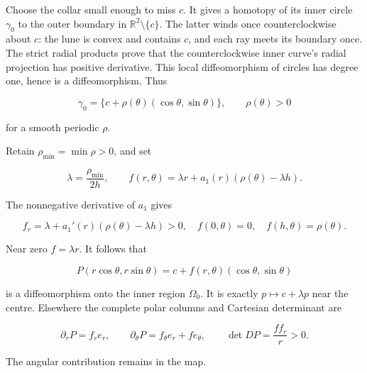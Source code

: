 Choose the collar small enough to miss \(c\). It gives a homotopy of its inner circle \(\gamma_0\) to the outer boundary in \(\mathbb R^2\setminus\{c\}\). The latter winds once counterclockwise about \(c\): the lune is convex and contains \(c\), and each ray meets its boundary once. The strict radial products prove that the counterclockwise inner curve's radial projection has positive derivative. This local diffeomorphism of circles has degree one, hence is a diffeomorphism. Thus

\begin{equation}
\gamma_0=\{c+\rho(\theta)(\cos\theta,\sin\theta)\},
\qquad \rho(\theta)>0
\label{courseIII:whitney-move-with-controlled-support:eq:4.12}
\end{equation}

for a smooth periodic \(\rho\).

Retain \(\rho_{\min}=\min\rho>0\), and set

\begin{equation}
\lambda=\frac{\rho_{\min}}{2h},\qquad
f(r,\theta)=\lambda r+a_1(r)(\rho(\theta)-\lambda h).
\label{courseIII:whitney-move-with-controlled-support:eq:4.13}
\end{equation}

The nonnegative derivative of \(a_1\) gives

\begin{equation}
f_r=\lambda+a_1'(r)(\rho(\theta)-\lambda h)>0,\quad
f(0,\theta)=0,\quad f(h,\theta)=\rho(\theta).
\label{courseIII:whitney-move-with-controlled-support:eq:4.14}
\end{equation}

Near zero \(f=\lambda r\). It follows that

\begin{equation}
P(r\cos\theta,r\sin\theta)=c+f(r,\theta)(\cos\theta,\sin\theta)
\label{courseIII:whitney-move-with-controlled-support:eq:4.15}
\end{equation}

is a diffeomorphism onto the inner region \(\Omega_0\). It is exactly \(p\mapsto c+\lambda p\) near the centre. Elsewhere the complete polar columns and Cartesian determinant are

\begin{equation}
\partial_rP=f_re_r,\qquad
\partial_\theta P=f_\theta e_r+fe_\theta,\qquad
\det DP=\frac{ff_r}{r}>0.
\label{courseIII:whitney-move-with-controlled-support:eq:4.16}
\end{equation}

The angular contribution remains in the map.

